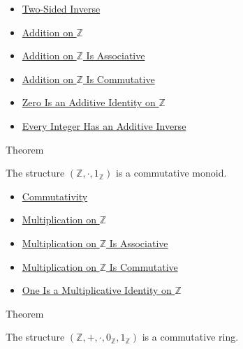 \begin{dependencies}
\begin{itemize}
  \item \hyperref[def:two-sided-inverse]{Two-Sided Inverse}
  \item \hyperref[def:addition-on-z-classes]{Addition on $\mathbb{Z}$}
  \item \hyperref[thm:addition-on-z-associative]{Addition on $\mathbb{Z}$ Is Associative}
  \item \hyperref[thm:addition-on-z-commutative]{Addition on $\mathbb{Z}$ Is Commutative}
  \item \hyperref[thm:zero-additive-identity-on-z]{Zero Is an Additive Identity on $\mathbb{Z}$}
  \item \hyperref[thm:every-integer-has-additive-inverse]{Every Integer Has an Additive Inverse}
\end{itemize}
\end{dependencies}

\begin{theorembox}{Theorem}
\begin{theorem}
\label{thm:z-multiplicative-commutative-monoid}
The structure $(\mathbb{Z},\cdot,1_{\mathbb{Z}})$ is a commutative monoid.
\end{theorem}
\end{theorembox}

\begin{dependencies}
\begin{itemize}
  \item \hyperref[def:commutativity]{Commutativity}
  \item \hyperref[def:multiplication-on-z-classes]{Multiplication on $\mathbb{Z}$}
  \item \hyperref[thm:multiplication-on-z-associative]{Multiplication on $\mathbb{Z}$ Is Associative}
  \item \hyperref[thm:multiplication-on-z-commutative]{Multiplication on $\mathbb{Z}$ Is Commutative}
  \item \hyperref[thm:one-multiplicative-identity-on-z]{One Is a Multiplicative Identity on $\mathbb{Z}$}
\end{itemize}
\end{dependencies}

\begin{theorembox}{Theorem}
\begin{theorem}
\label{thm:z-commutative-ring}
The structure $(\mathbb{Z},+,\cdot,0_{\mathbb{Z}},1_{\mathbb{Z}})$ is a
commutative ring.
\end{theorem}
\end{theorembox}


